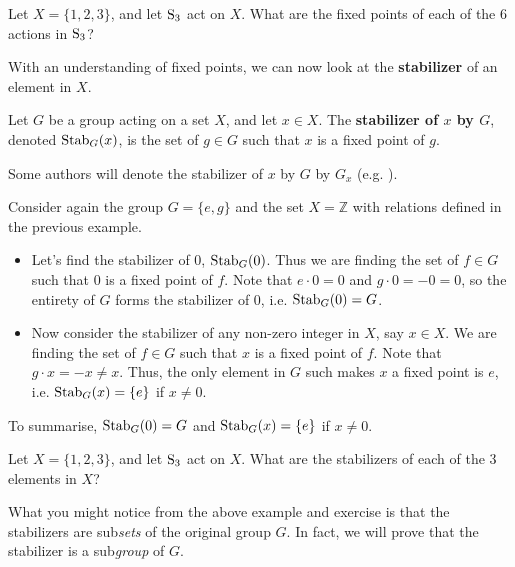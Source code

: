 \begin{exercise}
    Let $X = \{1, 2, 3\}$, and let $\mathrm{S}_{3}$ act on $X$. What are the fixed points of each of the 6 actions in $\mathrm{S}_{3}$?
\end{exercise}

With an understanding of fixed points, we can now look at the \textbf{stabilizer} of an element in $X$.

\begin{definition}
    Let $G$ be a group acting on a set $X$, and let $x \in X$. The \textbf{stabilizer of $x$ by $G$}, denoted $\mathrm{Stab}_{G}(x)$, is the set of $g \in G$ such that $x$ is a fixed point of $g$.
\end{definition}
\begin{remark}
    Some authors will denote the stabilizer of $x$ by $G$ by $G_x$ (e.g. \cite{clark_1984, humphreys_1996, brilliant_groupactions}).
\end{remark}

\begin{example}
    Consider again the group $G = \{e, g\}$ and the set $X = \mathbb{Z}$ with relations defined in the previous example.
    \begin{itemize}
        \item Let's find the stabilizer of 0, $\mathrm{Stab}_{G}(0)$. Thus we are finding the set of $f \in G$ such that 0 is a fixed point of $f$. Note that $e \cdot 0 = 0$ and $g \cdot 0 = -0 = 0$, so the entirety of $G$ forms the stabilizer of 0, i.e. $\mathrm{Stab}_{G}(0) = G$.
        \item Now consider the stabilizer of any non-zero integer in $X$, say $x \in X$. We are finding the set of $f \in G$ such that $x$ is a fixed point of $f$. Note that $g \cdot x = -x \neq x$. Thus, the only element in $G$ such makes $x$ a fixed point is $e$, i.e. $\mathrm{Stab}_{G}(x) = \{e\}$ if $x \neq 0$.
    \end{itemize}
    To summarise, $\mathrm{Stab}_{G}(0) = G$ and $\mathrm{Stab}_{G}(x) = \{e\}$ if $x \neq 0$.
\end{example}

\begin{exercise}
    Let $X = \{1, 2, 3\}$, and let $\mathrm{S}_{3}$ act on $X$. What are the stabilizers of each of the 3 elements in $X$?
\end{exercise}

What you might notice from the above example and exercise is that the stabilizers are sub\textit{sets} of the original group $G$. In fact, we will prove that the stabilizer is a sub\textit{group} of $G$.


